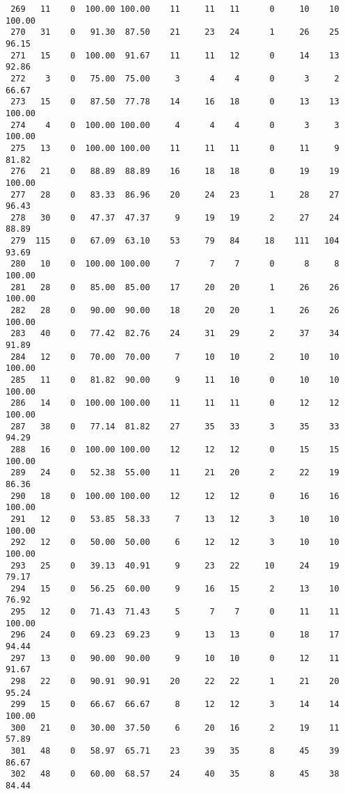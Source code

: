 \begin{verbatim}
 269   11    0  100.00 100.00    11     11   11      0     10    10   100.00
 270   31    0   91.30  87.50    21     23   24      1     26    25    96.15
 271   15    0  100.00  91.67    11     11   12      0     14    13    92.86
 272    3    0   75.00  75.00     3      4    4      0      3     2    66.67
 273   15    0   87.50  77.78    14     16   18      0     13    13   100.00
 274    4    0  100.00 100.00     4      4    4      0      3     3   100.00
 275   13    0  100.00 100.00    11     11   11      0     11     9    81.82
 276   21    0   88.89  88.89    16     18   18      0     19    19   100.00
 277   28    0   83.33  86.96    20     24   23      1     28    27    96.43
 278   30    0   47.37  47.37     9     19   19      2     27    24    88.89
 279  115    0   67.09  63.10    53     79   84     18    111   104    93.69
 280   10    0  100.00 100.00     7      7    7      0      8     8   100.00
 281   28    0   85.00  85.00    17     20   20      1     26    26   100.00
 282   28    0   90.00  90.00    18     20   20      1     26    26   100.00
 283   40    0   77.42  82.76    24     31   29      2     37    34    91.89
 284   12    0   70.00  70.00     7     10   10      2     10    10   100.00
 285   11    0   81.82  90.00     9     11   10      0     10    10   100.00
 286   14    0  100.00 100.00    11     11   11      0     12    12   100.00
 287   38    0   77.14  81.82    27     35   33      3     35    33    94.29
 288   16    0  100.00 100.00    12     12   12      0     15    15   100.00
 289   24    0   52.38  55.00    11     21   20      2     22    19    86.36
 290   18    0  100.00 100.00    12     12   12      0     16    16   100.00
 291   12    0   53.85  58.33     7     13   12      3     10    10   100.00
 292   12    0   50.00  50.00     6     12   12      3     10    10   100.00
 293   25    0   39.13  40.91     9     23   22     10     24    19    79.17
 294   15    0   56.25  60.00     9     16   15      2     13    10    76.92
 295   12    0   71.43  71.43     5      7    7      0     11    11   100.00
 296   24    0   69.23  69.23     9     13   13      0     18    17    94.44
 297   13    0   90.00  90.00     9     10   10      0     12    11    91.67
 298   22    0   90.91  90.91    20     22   22      1     21    20    95.24
 299   15    0   66.67  66.67     8     12   12      3     14    14   100.00
 300   21    0   30.00  37.50     6     20   16      2     19    11    57.89
 301   48    0   58.97  65.71    23     39   35      8     45    39    86.67
 302   48    0   60.00  68.57    24     40   35      8     45    38    84.44

\end{verbatim}
